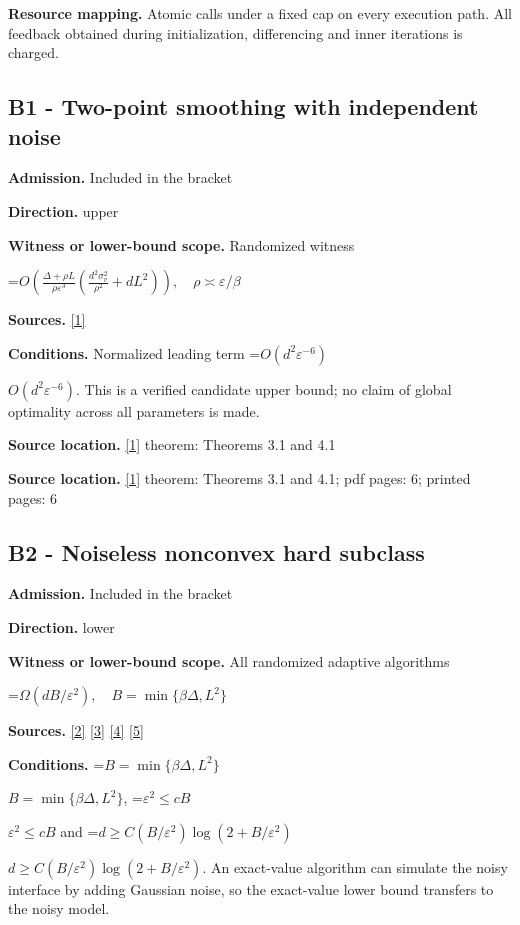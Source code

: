 \documentclass[10pt,a4paper]{article}
\newcommand{\AtlasMath}[1]{\par\begingroup\centering\setbox0=\hbox{$\displaystyle #1$}\ifdim\wd0>1.4\linewidth\typeout{ATLAS WIDE FORMULA: \the\wd0}\fi\ifdim\wd0>\linewidth\resizebox{\linewidth}{!}{\box0}\else\box0\fi\par\endgroup}
\newcommand{\AtlasInlineMath}[1]{\begingroup\setbox0=\hbox{$#1$}\ifdim\wd0>.4\linewidth\endgroup\AtlasMath{#1}\else\endgroup$#1$\fi}
\begin{document}
\textbf{Resource mapping.} Atomic calls under a fixed cap on every execution path. All feedback obtained during initialization, differencing and inner iterations is charged.

\subsection{B1 - Two-point smoothing with independent noise}
\textbf{Admission.} Included in the bracket

\textbf{Direction.} upper

\textbf{Witness or lower-bound scope.} Randomized witness

\AtlasMath{O\!\left(\frac{\Delta+\rho L}{\rho\varepsilon^3}\left(\frac{d^2\sigma_v^2}{\rho^2}+dL^2\right)\right),\quad\rho\asymp\varepsilon/\beta}
\textbf{Sources.} \href{https://arxiv.org/html/2605.06549v1}{[1]}

\textbf{Conditions.} Normalized leading term \AtlasInlineMath{O(d^2\varepsilon^{-6})}. This is a verified candidate upper bound; no claim of global optimality across all parameters is made.

\textbf{Source location.} \href{https://arxiv.org/html/2605.06549v1}{[1]} theorem: Theorems 3.1 and 4.1

\textbf{Source location.} \href{https://arxiv.org/html/2605.06549v1}{[1]} theorem: Theorems 3.1 and 4.1; pdf pages: 6; printed pages: 6

\subsection{B2 - Noiseless nonconvex hard subclass}
\textbf{Admission.} Included in the bracket

\textbf{Direction.} lower

\textbf{Witness or lower-bound scope.} All randomized adaptive algorithms

\AtlasMath{\Omega(dB/\varepsilon^2),\quad B=\min\{\beta \Delta,L^2\}}
\textbf{Sources.} \href{https://arxiv.org/html/2610.19652v1}{[2]} \href{https://arxiv.org/html/2609.00045v3}{[3]} \href{https://arxiv.org/pdf/2610.00245v2}{[4]} \href{https://arxiv.org/html/2610.17074v1}{[5]}

\textbf{Conditions.} \AtlasInlineMath{B=\min\{\beta\Delta,L^2\}}, \AtlasInlineMath{\varepsilon^2\le cB} and \AtlasInlineMath{d\ge C(B/\varepsilon^2)\log(2+B/\varepsilon^2)}. An exact-value algorithm can simulate the noisy interface by adding Gaussian noise, so the exact-value lower bound transfers to the noisy model.
\end{document}
